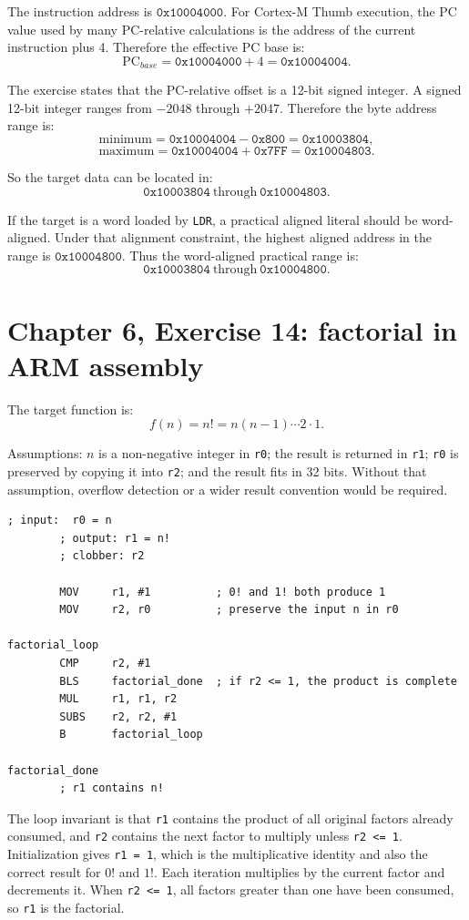 \documentclass[11pt]{article}
\newcommand{\code}[1]{\texttt{#1}}
\begin{document}
The instruction address is \(\code{0x10004000}\). For Cortex-M Thumb execution, the PC value used by many PC-relative calculations is the address of the current instruction plus 4. Therefore the effective PC base is:
\[
\mathrm{PC}_{base} = \code{0x10004000} + 4 = \code{0x10004004}.
\]

The exercise states that the PC-relative offset is a 12-bit signed integer. A signed 12-bit integer ranges from \(-2048\) through \(+2047\). Therefore the byte address range is:
\[
\mathrm{minimum} = \code{0x10004004} - \code{0x800} = \code{0x10003804},
\]
\[
\mathrm{maximum} = \code{0x10004004} + \code{0x7FF} = \code{0x10004803}.
\]

So the target data can be located in:
\[
\code{0x10003804}\ \text{through}\ \code{0x10004803}.
\]

If the target is a word loaded by \code{LDR}, a practical aligned literal should be word-aligned. Under that alignment constraint, the highest aligned address in the range is \(\code{0x10004800}\). Thus the word-aligned practical range is:
\[
\code{0x10003804}\ \text{through}\ \code{0x10004800}.
\]

\section*{Chapter 6, Exercise 14: factorial in ARM assembly}

The target function is:
\[
f(n) = n! = n(n-1)\cdots 2 \cdot 1.
\]

Assumptions: \(n\) is a non-negative integer in \code{r0}; the result is returned in \code{r1}; \code{r0} is preserved by copying it into \code{r2}; and the result fits in 32 bits. Without that assumption, overflow detection or a wider result convention would be required.

\begin{Verbatim}[fontsize=\small]
        ; input:  r0 = n
        ; output: r1 = n!
        ; clobber: r2

        MOV     r1, #1          ; 0! and 1! both produce 1
        MOV     r2, r0          ; preserve the input n in r0

factorial_loop
        CMP     r2, #1
        BLS     factorial_done  ; if r2 <= 1, the product is complete
        MUL     r1, r1, r2
        SUBS    r2, r2, #1
        B       factorial_loop

factorial_done
        ; r1 contains n!
\end{Verbatim}

The loop invariant is that \code{r1} contains the product of all original factors already consumed, and \code{r2} contains the next factor to multiply unless \code{r2 <= 1}. Initialization gives \code{r1 = 1}, which is the multiplicative identity and also the correct result for \(0!\) and \(1!\). Each iteration multiplies by the current factor and decrements it. When \code{r2 <= 1}, all factors greater than one have been consumed, so \code{r1} is the factorial.
\end{document}
